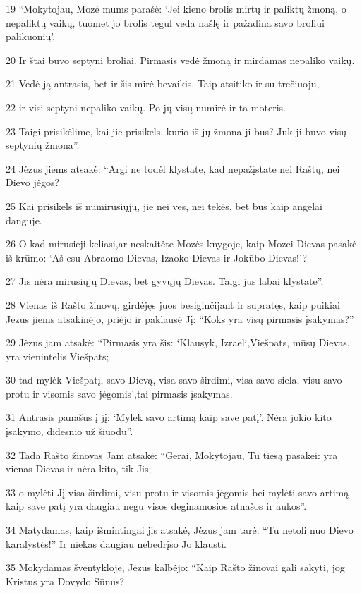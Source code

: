 \par 19 “Mokytojau, Mozė mums parašė: ‘Jei kieno brolis mirtų ir paliktų žmoną, o nepaliktų vaikų, tuomet jo brolis tegul veda našlę ir pažadina savo broliui palikuonių’. 
\par 20 Ir štai buvo septyni broliai. Pirmasis vedė žmoną ir mirdamas nepaliko vaikų. 
\par 21 Vedė ją antrasis, bet ir šis mirė bevaikis. Taip atsitiko ir su trečiuoju, 
\par 22 ir visi septyni nepaliko vaikų. Po jų visų numirė ir ta moteris. 
\par 23 Taigi prisikėlime, kai jie prisikels, kurio iš jų žmona ji bus? Juk ji buvo visų septynių žmona”. 
\par 24 Jėzus jiems atsakė: “Argi ne todėl klystate, kad nepažįstate nei Raštų, nei Dievo jėgos? 
\par 25 Kai prisikels iš numirusiųjų, jie nei ves, nei tekės, bet bus kaip angelai danguje. 
\par 26 O kad mirusieji keliasi,­ar neskaitėte Mozės knygoje, kaip Mozei Dievas pasakė iš krūmo: ‘Aš esu Abraomo Dievas, Izaoko Dievas ir Jokūbo Dievas!’? 
\par 27 Jis nėra mirusiųjų Dievas, bet gyvųjų Dievas. Taigi jūs labai klystate”. 
\par 28 Vienas iš Rašto žinovų, girdėjęs juos besiginčijant ir supratęs, kaip puikiai Jėzus jiems atsakinėjo, priėjo ir paklausė Jį: “Koks yra visų pirmasis įsakymas?” 
\par 29 Jėzus jam atsakė: “Pirmasis yra šis: ‘Klausyk, Izraeli,­Viešpats, mūsų Dievas, yra vienintelis Viešpats; 
\par 30 tad mylėk Viešpatį, savo Dievą, visa savo širdimi, visa savo siela, visu savo protu ir visomis savo jėgomis’,­tai pirmasis įsakymas. 
\par 31 Antrasis panašus į jį: ‘Mylėk savo artimą kaip save patį’. Nėra jokio kito įsakymo, didesnio už šiuodu”. 
\par 32 Tada Rašto žinovas Jam atsakė: “Gerai, Mokytojau, Tu tiesą pasakei: yra vienas Dievas ir nėra kito, tik Jis; 
\par 33 o mylėti Jį visa širdimi, visu protu ir visomis jėgomis bei mylėti savo artimą kaip save patį yra daugiau negu visos deginamosios atnašos ir aukos”. 
\par 34 Matydamas, kaip išmintingai jis atsakė, Jėzus jam tarė: “Tu netoli nuo Dievo karalystės!” Ir niekas daugiau nebedrįso Jo klausti. 
\par 35 Mokydamas šventykloje, Jėzus kalbėjo: “Kaip Rašto žinovai gali sakyti, jog Kristus yra Dovydo Sūnus? 
